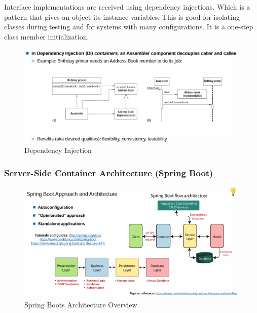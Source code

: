 \documentclass[../Main.tex]{subfiles}
\begin{document}
Interface implementations are received using dependency injections.
Which is a pattern that gives an object its instance variables.
This is good for isolating classes during testing and for systems
with many configurations. It is a one-step class member initialization.

\begin{figure}[H]
    \centering
    \includegraphics[width=1\linewidth]{Images/dep-injection.png}
    \caption{Dependency Injection}
\end{figure}

\subsubsection{Server-Side Container Architecture (Spring Boot)}

\begin{figure}[H]
    \centering
    \includegraphics[width=1\linewidth]{Images/spring-boot-arch.png}
    \caption{Spring Boots Architecture Overview}
\end{figure}
\end{document}
